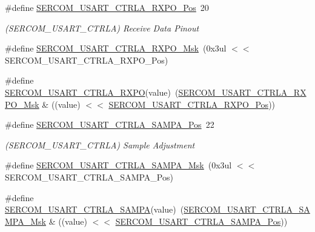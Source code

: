 \begin{DoxyCompactItemize}
\item 
\#define \mbox{\hyperlink{group___s_a_m_d21___s_e_r_c_o_m_gabd9b6a90ba85b567c1b4abc403ce360d}{S\+E\+R\+C\+O\+M\+\_\+\+U\+S\+A\+R\+T\+\_\+\+C\+T\+R\+L\+A\+\_\+\+R\+X\+P\+O\+\_\+\+Pos}}~20
\begin{DoxyCompactList}\small\item\em (S\+E\+R\+C\+O\+M\+\_\+\+U\+S\+A\+R\+T\+\_\+\+C\+T\+R\+LA) Receive Data Pinout \end{DoxyCompactList}\item 
\#define \mbox{\hyperlink{group___s_a_m_d21___s_e_r_c_o_m_ga1f4a123b6bb332a9b92ab698d50720e0}{S\+E\+R\+C\+O\+M\+\_\+\+U\+S\+A\+R\+T\+\_\+\+C\+T\+R\+L\+A\+\_\+\+R\+X\+P\+O\+\_\+\+Msk}}~(0x3ul $<$$<$ S\+E\+R\+C\+O\+M\+\_\+\+U\+S\+A\+R\+T\+\_\+\+C\+T\+R\+L\+A\+\_\+\+R\+X\+P\+O\+\_\+\+Pos)
\item 
\#define \mbox{\hyperlink{group___s_a_m_d21___s_e_r_c_o_m_gafdd4e7d8a22f28f4d60010efc8db5e6f}{S\+E\+R\+C\+O\+M\+\_\+\+U\+S\+A\+R\+T\+\_\+\+C\+T\+R\+L\+A\+\_\+\+R\+X\+PO}}(value)~(\mbox{\hyperlink{group___s_a_m_d21___s_e_r_c_o_m_ga1f4a123b6bb332a9b92ab698d50720e0}{S\+E\+R\+C\+O\+M\+\_\+\+U\+S\+A\+R\+T\+\_\+\+C\+T\+R\+L\+A\+\_\+\+R\+X\+P\+O\+\_\+\+Msk}} \& ((value) $<$$<$ \mbox{\hyperlink{group___s_a_m_d21___s_e_r_c_o_m_gabd9b6a90ba85b567c1b4abc403ce360d}{S\+E\+R\+C\+O\+M\+\_\+\+U\+S\+A\+R\+T\+\_\+\+C\+T\+R\+L\+A\+\_\+\+R\+X\+P\+O\+\_\+\+Pos}}))
\item 
\#define \mbox{\hyperlink{group___s_a_m_d21___s_e_r_c_o_m_gaf908d1b3dd997b4458deb9d3711be15b}{S\+E\+R\+C\+O\+M\+\_\+\+U\+S\+A\+R\+T\+\_\+\+C\+T\+R\+L\+A\+\_\+\+S\+A\+M\+P\+A\+\_\+\+Pos}}~22
\begin{DoxyCompactList}\small\item\em (S\+E\+R\+C\+O\+M\+\_\+\+U\+S\+A\+R\+T\+\_\+\+C\+T\+R\+LA) Sample Adjustment \end{DoxyCompactList}\item 
\#define \mbox{\hyperlink{group___s_a_m_d21___s_e_r_c_o_m_ga207407cf020acc2f174a489b8bb5201d}{S\+E\+R\+C\+O\+M\+\_\+\+U\+S\+A\+R\+T\+\_\+\+C\+T\+R\+L\+A\+\_\+\+S\+A\+M\+P\+A\+\_\+\+Msk}}~(0x3ul $<$$<$ S\+E\+R\+C\+O\+M\+\_\+\+U\+S\+A\+R\+T\+\_\+\+C\+T\+R\+L\+A\+\_\+\+S\+A\+M\+P\+A\+\_\+\+Pos)
\item 
\#define \mbox{\hyperlink{group___s_a_m_d21___s_e_r_c_o_m_gaec47e632fb96d43ff42b36110c2ff181}{S\+E\+R\+C\+O\+M\+\_\+\+U\+S\+A\+R\+T\+\_\+\+C\+T\+R\+L\+A\+\_\+\+S\+A\+M\+PA}}(value)~(\mbox{\hyperlink{group___s_a_m_d21___s_e_r_c_o_m_ga207407cf020acc2f174a489b8bb5201d}{S\+E\+R\+C\+O\+M\+\_\+\+U\+S\+A\+R\+T\+\_\+\+C\+T\+R\+L\+A\+\_\+\+S\+A\+M\+P\+A\+\_\+\+Msk}} \& ((value) $<$$<$ \mbox{\hyperlink{group___s_a_m_d21___s_e_r_c_o_m_gaf908d1b3dd997b4458deb9d3711be15b}{S\+E\+R\+C\+O\+M\+\_\+\+U\+S\+A\+R\+T\+\_\+\+C\+T\+R\+L\+A\+\_\+\+S\+A\+M\+P\+A\+\_\+\+Pos}}))

\end{DoxyCompactItemize}

